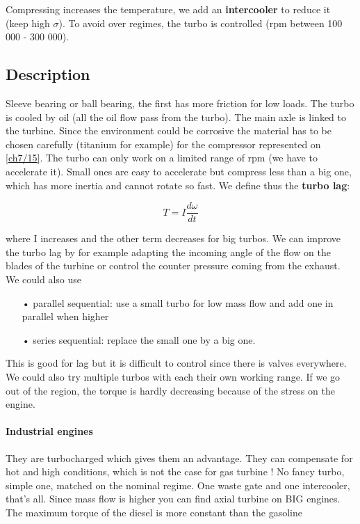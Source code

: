 	Compressing increases the temperature, we add an \textbf{intercooler} to reduce it (keep high $\sigma$). To avoid over regimes, the turbo is controlled (rpm between 100 000 - 300 000). 
	
\subsection{Description}
	Sleeve bearing or ball bearing, the first has more friction for low loads. The turbo is cooled by oil (all the oil flow pass from the turbo).  The main axle is linked to the turbine. Since the environment could be corrosive the material has to be chosen carefully (titanium for example) for the compressor represented on \autoref{ch7/15}. The turbo can only work on a limited range of rpm (we have to accelerate it). Small ones are easy to accelerate but compress less than a big one, which has more inertia and cannot rotate so fast. We define thus the \textbf{turbo lag}: 
	
	\begin{equation}
	T = I \frac{d\omega}{dt}
	\end{equation}
	
	where I increases and the other term decreases for big turbos. We can improve the turbo lag by for example adapting the incoming angle of the flow on the blades of the turbine or control the counter pressure coming from the exhaust. We could also use 
	
	\begin{itemize}
	\item[•] parallel sequential: use a small turbo for low mass flow and add one in parallel when higher
	\item[•] series sequential: replace the small one by a big one. \\
	\end{itemize}
	
	This is good for lag but it is difficult to control since there is valves everywhere. We could also try multiple turbos with each their own working range. If we go out of the region, the torque is hardly decreasing because of the stress on the engine. 
	
\paragraph{Industrial engines}
	They are turbocharged which gives them an advantage. They can compensate for hot and high conditions, which is not the case for gas turbine ! No fancy turbo, simple one, matched on the nominal regime. One waste gate and one intercooler, that’s all. Since mass flow is higher you can find axial turbine on BIG engines. The maximum torque of the diesel is more constant than the gasoline
	
